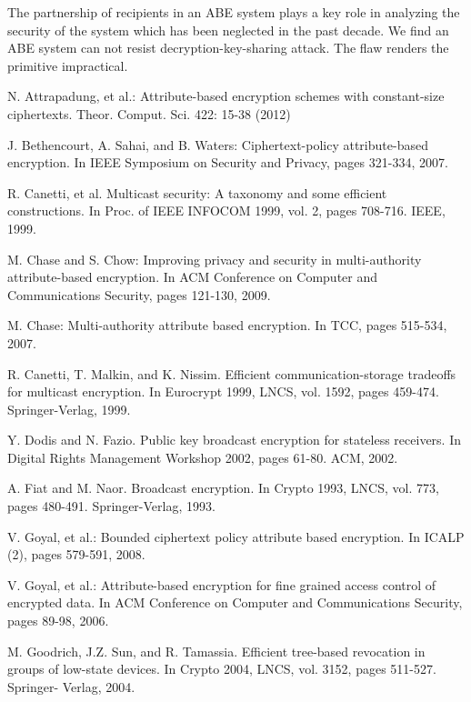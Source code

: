 \documentclass[11pt]{article}
\renewcommand{\baselinestretch}{1.2}
\renewcommand{\arraystretch}{1.0}
\begin{document}
  The partnership of recipients in an ABE system plays a key role in analyzing the  security of the  system which has been neglected in the past decade.
  We find an ABE system can not resist decryption-key-sharing attack.
    The flaw renders the primitive impractical.

\begin{thebibliography}{4}

\renewcommand{\baselinestretch}{1.0}
  \renewcommand{\arraystretch}{.9}
  \normalsize \small \parskip 0mm

   N. Attrapadung, et al.: Attribute-based encryption schemes with constant-size ciphertexts. Theor. Comput. Sci. 422: 15-38 (2012)

   J. Bethencourt, A. Sahai, and B. Waters: Ciphertext-policy attribute-based encryption. In
IEEE Symposium on Security and Privacy, pages 321-334, 2007.

 R. Canetti, et al. Multicast security:
A taxonomy and some efficient constructions. In Proc. of IEEE INFOCOM 1999, vol. 2,
pages 708-716. IEEE, 1999.

 M. Chase and S. Chow: Improving privacy and security in multi-authority attribute-based
encryption. In ACM Conference on Computer and Communications Security, pages 121-130,
2009.

 M. Chase: Multi-authority attribute based encryption. In TCC, pages 515-534, 2007.

 R. Canetti, T. Malkin, and K. Nissim. Efficient communication-storage tradeoffs for multicast
encryption. In Eurocrypt 1999, LNCS, vol. 1592, pages 459-474. Springer-Verlag, 1999.

 Y. Dodis and N. Fazio. Public key broadcast encryption for stateless receivers.
In Digital Rights Management Workshop 2002, pages 61-80.  ACM, 2002.

 A. Fiat and M. Naor. Broadcast encryption. In Crypto 1993,  LNCS, vol. 773,
pages 480-491. Springer-Verlag, 1993.

 V. Goyal, et al.: Bounded ciphertext policy attribute
based encryption. In ICALP (2), pages 579-591, 2008.

 V. Goyal, et al.:  Attribute-based encryption for fine grained
access control of encrypted data. In ACM Conference on Computer and Communications
Security, pages 89-98, 2006.

 M. Goodrich, J.Z. Sun, and R. Tamassia. Efficient tree-based revocation in groups of
low-state devices. In Crypto 2004, LNCS, vol. 3152,  pages 511-527. Springer-
Verlag, 2004.


\end{thebibliography}
\end{document}
